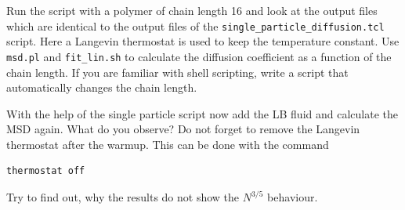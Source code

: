 Run the script with a polymer of chain length 16 and look at the output files
which are identical to the output files of the 
\lstinline|single_particle_diffusion.tcl|
script. Here a Langevin thermostat is used to keep the temperature constant.
Use \lstinline|msd.pl| and \lstinline|fit_lin.sh| to calculate the diffusion
coefficient as a function of the chain length. If you are familiar with
shell scripting, write a script that automatically changes the chain length.

With the help of the single particle script now add the LB fluid and calculate
the MSD again. What do you observe? Do not forget to remove the Langevin 
thermostat after the warmup. This can be done with the command
{\vspace{0,2cm}\small
\begin{lstlisting}[numbers=none]
thermostat off
\end{lstlisting}\vspace{0,2cm}
} 
Try to find out, why the results do not show the $N^{3/5}$ behaviour.
